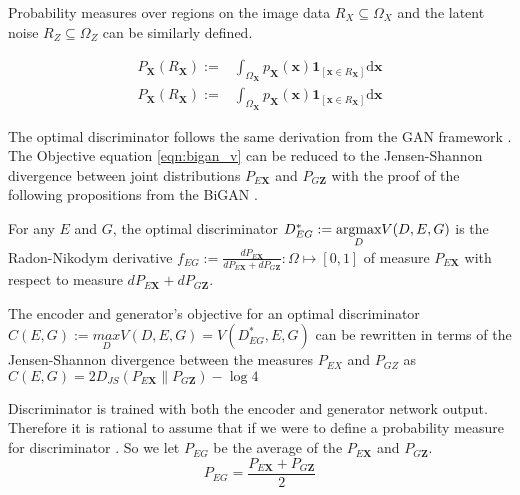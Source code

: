 Probability measures over regions on the image data $R_X \subseteq \Omega_{X}$ and the latent noise
$R_Z \subseteq \Omega_{Z}$ can be similarly defined.

\begin{align}
    P_{\mathbf{X}}\left(R_{\mathbf{X}}\right) :=&\int_{\Omega_{\mathbf{X}}} p_{\mathbf{X}}(\mathbf{x}) \mathbf{1}_{\left[\mathbf{x} \in R_{\mathbf{X}}\right]} \mathrm{d} \mathbf{x} \\[5pt]
    P_{\mathbf{X}}\left(R_{\mathbf{X}}\right) :=&\int_{\Omega_{\mathbf{X}}} p_{\mathbf{X}}(\mathbf{x}) \mathbf{1}_{\left[\mathbf{x} \in R_{\mathbf{X}}\right]} \mathrm{d} \mathbf{x}
\end{align}

The optimal discriminator follows the same derivation from the GAN framework
\cite{Goodfellow:2014:GAN:2969033.2969125}. The Objective equation \ref{eqn:bigan_v} can be reduced
to the Jensen-Shannon divergence between joint distributions $P_{E\mathbf{X}}$ and $P_{G\mathbf{Z}}$
with the proof of the following propositions from the BiGAN \cite{Donahue2017AdversarialFL}.

\begin{prop}
    \label{prop:bigan_1}
    For any $E$ and $G$, the optimal discriminator $D^*_{EG} := \\ \underset{D}{\text{argmax}}  V(D, E,
    G)$ is the Radon-Nikodym derivative $f_{EG} := \frac{dP_{E\mathbf{X}}}{dP_{E\mathbf{X}} +
    dP_{G\mathbf{Z}}}  : \Omega  \mapsto [0, 1]$ of measure $P_{E\mathbf{X}}$ with respect to measure
    $ dP_{E\mathbf{X}} + dP_{G\mathbf{Z}}$.
\end{prop}

\begin{prop}
    \label{prop:bigan_2}
  The encoder and generator's objective for an optimal discriminator $C(E, G):= \underset{D}{max}
  V(D, E, G) = V(D^*_{EG}, E, G)$ can be rewritten in terms of the Jensen-Shannon divergence between
  the measures $P_{EX}$ and $P_{GZ}$ as $C(E, G) = 2 D_{JS} (P_{E\mathbf{X}} \parallel P_{G\mathbf{Z}}) -
  \log 4$    
\end{prop}

Discriminator is trained with both the encoder and generator network output. Therefore it is
rational to assume that if we were to define a probability measure for discriminator . So we let $P_{EG}$
be the average of the $P_{E\mathbf{X}}$ and $P_{G\mathbf{Z}}$. 
\begin{equation}
  P_{EG} = \frac{P_{E\mathbf{X}} + P_{G\mathbf{Z}}}{2}  
\end{equation}

